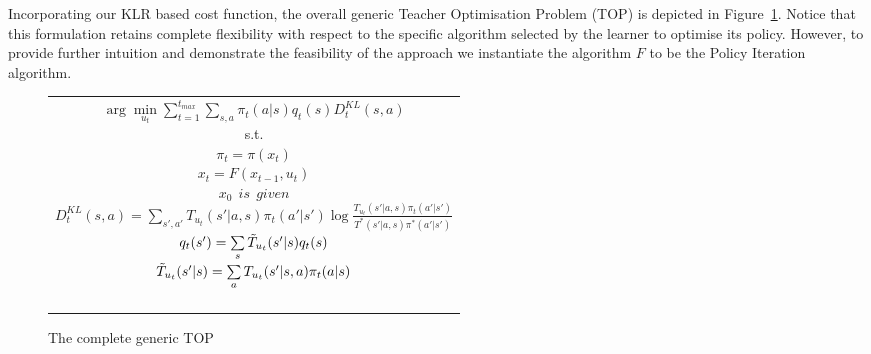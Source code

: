 \documentclass[letterpaper]{aamas2010}
\begin{document}
Incorporating our KLR based cost function, the overall generic Teacher
Optimisation Problem (TOP) is depicted in Figure~\ref{t_opt}. Notice
that this formulation retains complete flexibility with respect to the
specific algorithm selected by the learner to optimise its
policy. However, to provide further intuition and demonstrate the
feasibility of the approach we instantiate the algorithm $F$ to be the
Policy Iteration algorithm.
\begin{figure}[ht]
\begin{tabular}{|c|} \hline \parbox{3.2 in} {\center 
$\arg\min\limits_{u_t}\sum\limits_{t=1}^{t_{max}}\sum\limits_{s,a}\pi_t(a|s)q_t(s)D^{KL}_t(s,a)$\\
s.t.\\
$\pi_t=\pi(x_t)$\\
$x_t=F(x_{t-1},u_t)$\\
$x_0\ \ \displaystyle{is\ \ given}$\\
$D^{KL}_t(s,a)=\sum\limits_{s',a'}T_{u_t}(s'|a,s)\pi_t(a'|s')\log\frac{T_{u_t}(s'|a,s)\pi_t(a'|s')}{T^*(s'|a,s)\pi^*(a'|s')}$\\
$q_t(s')=\sum\limits_s\Tilde{T}_{u_t}(s'|s)q_t(s)$\\
$\Tilde{T}_{u_t}(s'|s)=\sum\limits_aT_{u_t}(s'|s,a)\pi_t(a|s)$\\\ \\
}\\ \hline \end{tabular}
\caption{\label{t_opt}The complete generic TOP}
\end{figure}
\end{document}
